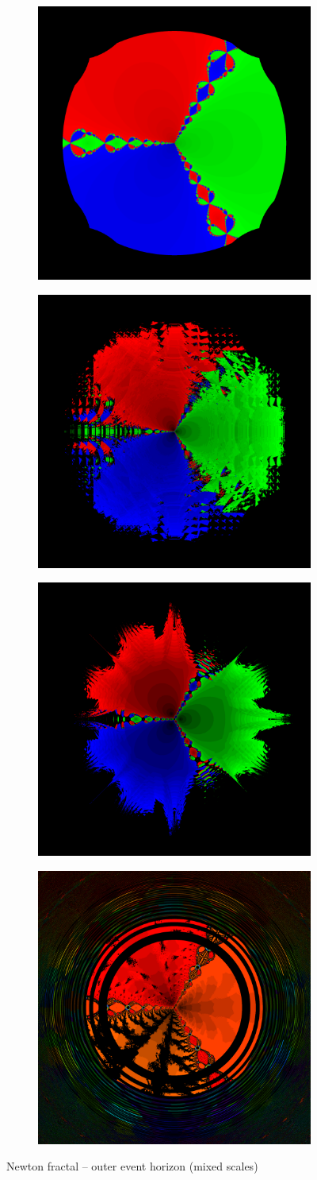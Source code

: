\documentclass[sigconf,authorversion,nonacm]{acmart}
\begin{document}
\begin{figure}
    \begin{subfigure}[F32]
        \centering
        \includegraphics[width=0.23\linewidth]{images/event_horizon/f32_horizon.png}
    \end{subfigure}
    \quad
    \begin{subfigure}[P16]
        \centering
        \includegraphics[width=0.23\linewidth]{images/event_horizon/P16_horizon.png}
    \end{subfigure}
    \quad
    \begin{subfigure}[MaskedFloat<4,50>]
        \centering
        \includegraphics[width=0.23\linewidth]{images/event_horizon/MaskedFloat_4_50_horizon.png}
    \end{subfigure}
    \quad
    \begin{subfigure}[I22F10]
        \centering
        \includegraphics[width=0.23\linewidth]{images/event_horizon/I22F10_horizon.png}
    \end{subfigure}
    \caption{Newton fractal -- outer event horizon (mixed scales)}
    \label{fig:newton-outer-horizon}
\end{figure}
\end{document}
